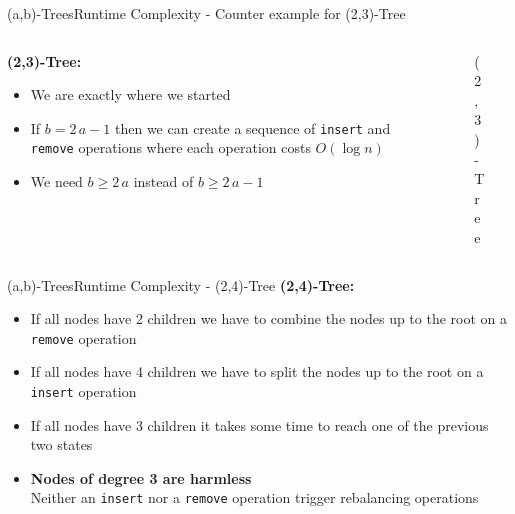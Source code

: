 \begin{frame}{(a,b)-Trees}{Runtime Complexity - Counter example for (2,3)-Tree}
  \begin{columns}
    \begin{column}{0.6\linewidth}
      \textbf{(2,3)-Tree:}
      \begin{itemize}
        \item<2->
          We are exactly where we started
        \item<3->
          If {\color{Mittel-Blau}$b=2\,a-1$} then we can create a sequence of
          \texttt{\color{Mittel-Blau}insert} and
          \texttt{\color{Mittel-Blau}remove} operations where each operation
          costs {\color{Mittel-Blau}$O(\log n)$}
        \item<4->
          We need {\color{Mittel-Blau}$b \geq 2 \, a$} instead of
          {\color{Mittel-Blau}$b \geq 2 \, a - 1$}
      \end{itemize}
    \end{column}
    \begin{column}{0.4\linewidth}
      \begin{figure}
        \begin{adjustbox}{width=\linewidth}
          
        \end{adjustbox}
        \vspace{-1.5em}
        \label{fig:a_b_tree:2_3_tree_10}
        \caption{(2,3)-Tree}
      \end{figure}
    \end{column}
  \end{columns}
\end{frame}


\begin{frame}{(a,b)-Trees}{Runtime Complexity - (2,4)-Tree}
  \textbf{(2,4)-Tree:}
  \begin{itemize}
    \item<2->
      If all nodes have {\color{Mittel-Blau}2 children} we have to
      {\color{Mittel-Blau}combine} the nodes up to the root on a
      \texttt{\color{Mittel-Blau}remove} operation
    \item<3->
      If all nodes have {\color{Mittel-Blau}4 children} we have to
      {\color{Mittel-Blau}split} the nodes up to the root on a
      \texttt{\color{Mittel-Blau}insert} operation
    \item<4->
      If all nodes have {\color{Mittel-Blau}3 children} it takes some time
      to reach one of the previous two states
    \item<5->[$\Rightarrow$]
      \textbf{Nodes of degree 3 are harmless}\\
      Neither an \texttt{\color{Mittel-Blau}insert} nor a
      \texttt{\color{Mittel-Blau}remove} operation trigger rebalancing
      operations
  \end{itemize}
\end{frame}

